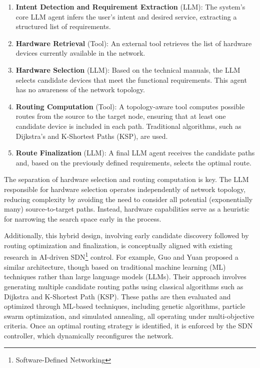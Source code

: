 \begin{enumerate}
    \item \textbf{Intent Detection and Requirement Extraction} (LLM): The system's core LLM agent infers the user's intent and desired service, extracting a structured list of requirements.
    
    \item \textbf{Hardware Retrieval} (Tool): An external tool retrieves the list of hardware devices currently available in the network.
    
    \item \textbf{Hardware Selection} (LLM): Based on the technical manuals, the LLM selects candidate devices that meet the functional requirements. This agent has no awareness of the network topology.
    
    \item \textbf{Routing Computation} (Tool): A topology-aware tool computes possible routes from the source to the target node, ensuring that at least one candidate device is included in each path. Traditional algorithms, such as Dijkstra's and K-Shortest Paths (KSP), are used.
    
    \item \textbf{Route Finalization} (LLM): A final LLM agent receives the candidate paths and, based on the previously defined requirements, selects the optimal route.
    
    \end{enumerate}
    


The separation of hardware selection and routing computation is key. The LLM responsible for hardware selection operates independently of network topology, reducing complexity by avoiding the need to consider all potential (exponentially many) source-to-target paths. Instead, hardware capabilities serve as a heuristic for narrowing the search space early in the process.

Additionally, this hybrid design, involving early candidate discovery followed by routing optimization and finalization, is conceptually aligned with existing research in AI-driven SDN\footnote{Software-Defined Networking} control. For example, Guo and Yuan \cite{guo2021network} proposed a similar architecture, though based on traditional machine learning (ML) techniques rather than large language models (LLMs). Their approach involves generating multiple candidate routing paths using classical algorithms such as Dijkstra and K-Shortest Path (KSP). These paths are then evaluated and optimized through ML-based techniques, including genetic algorithms, particle swarm optimization, and simulated annealing, all operating under multi-objective criteria. Once an optimal routing strategy is identified, it is enforced by the SDN controller, which dynamically reconfigures the network. 


